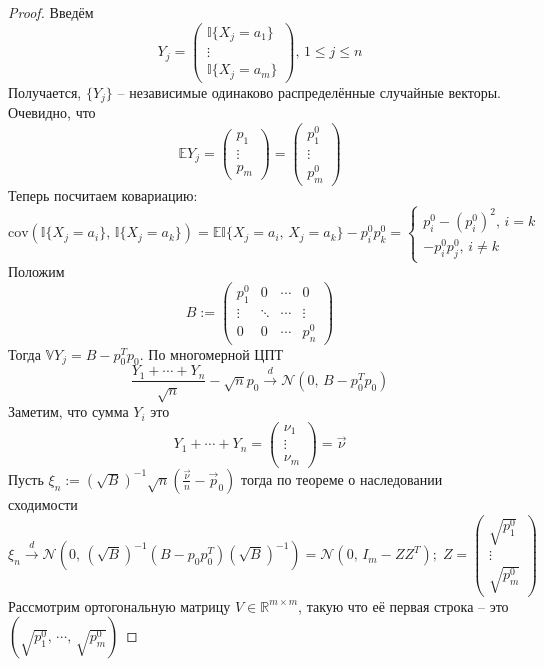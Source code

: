 \documentclass[a4paper,12pt]{article}
\renewcommand{\leq}{\ensuremath{\leqslant}}
\theoremstyle{plain}
\theoremstyle{definition}
\theoremstyle{remark}
\begin{document}
\begin{proof}
  Введём
  \[
    Y_j = \begin{pmatrix}
      \mathbb{I}\{X_j = a_1\}\\
      \vdots\\
      \mathbb{I}\{X_j = a_m\}
    \end{pmatrix},\, 1 \leq j \leq n
  \]
  Получается, $\{Y_j\}$ -- независимые одинаково распределённые случайные векторы. Очевидно, что
  \[
    \mathbb{E}Y_j = \begin{pmatrix}
      p_1\\
      \vdots\\
      p_m
    \end{pmatrix} = \begin{pmatrix}
      p_1^0\\
      \vdots\\
      p_m^0
    \end{pmatrix}
  \]
  Теперь посчитаем ковариацию:
  \[
    \text{cov}(\mathbb{I}\{X_j = a_i\},\, \mathbb{I}\{X_j = a_k\}) = \mathbb{E}\mathbb{I}\{X_j = a_i,\, X_j = a_k\} - p_i^0p_k^0 = \begin{cases}
      p_i^0 - (p_i^0)^2,\, i = k\\
      -p_i^0p_j^0,\, i \neq k
    \end{cases}
  \]
  Положим
  \[
    B := \begin{pmatrix}
      p_1^0 & 0 & \cdots & 0\\
      \vdots & \ddots & \cdots & \vdots\\
      0 & 0 & \cdots & p_n^0
    \end{pmatrix}
  \]
  Тогда $\mathbb{V}Y_j = B - p_0^Tp_0$. По многомерной ЦПТ 
  \[
    \frac{Y_1 + \cdots + Y_n}{\sqrt{n}} - \sqrt{n}p_0 \overset{d}{\to} \mathcal{N}(0,\, B - p_0^Tp_0)
  \]
  Заметим, что сумма $Y_i$ это
  \[
    Y_1 + \cdots + Y_n = \begin{pmatrix}
      \nu_1\\
      \vdots\\
      \nu_m
    \end{pmatrix} = \vec{\nu}
  \]
  Пусть $\xi_n := (\sqrt{B})^{-1}\sqrt{n}\left(\frac{\vec{\nu}}{n} - \vec{p}_0\right)$ тогда по теореме о наследовании сходимости
  \[
    \xi_n \overset{d}{\to} \mathcal{N}(0,\,(\sqrt{B})^{-1}(B - p_0p_0^T)(\sqrt{B})^{-1}) = \mathcal{N}(0,\,I_m - ZZ^T);\; Z = \begin{pmatrix}
      \sqrt{p_1^0}\\
      \vdots\\
      \sqrt{p_m^0}
    \end{pmatrix}
  \]
  Рассмотрим ортогональную матрицу $V \in \mathbb{R}^{m \times m}$, такую что её первая строка -- это $(\sqrt{p_1^0},\,\cdots,\,\sqrt{p_m^0})$
  

\end{proof}
\end{document}
